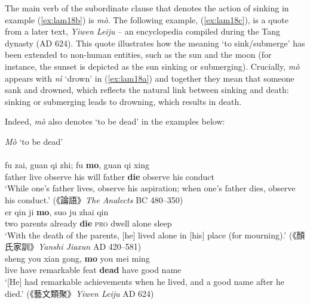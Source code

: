 \documentclass[output=paper,colorlinks,citecolor=brown,chinesefont]{langscibook}
\begin{document}
The main verb of the subordinate clause that denotes the action of sinking in example (\ref{ex:lam18b}) is \textit{mò}. The following example, (\ref{ex:lam18c}), is a quote from a later text, \emph{Yiwen Leiju} – an encyclopedia compiled during the Tang dynasty (AD 624). This quote illustrates how the meaning `to sink/submerge' has been extended to non-human entities, such as the sun and the moon (for instance, the sunset is depicted as the sun sinking or submerging). Crucially, \textit{mò} appears with \textit{nì} `drown' in (\ref{ex:lam18a}) and together they mean that someone sank and drowned, which reflects the natural link between sinking and death: sinking or submerging leads to drowning, which results in death. 

Indeed, \textit{mò} also denotes `to be dead' in the examples below: 

\newpage

\ea \textit{Mò} `to be dead'  \label{ex:lam19}\\
  \\
  	\gll fu zai, guan qi zhi; fu \textbf{mo}, guan qi xing\\
  	father live observe	his	will father	\textbf{die} observe his	conduct\\
  	\glt `While one's father lives, observe his aspiration; when one's father dies, observe his conduct.' ({\cn 《論語》}\emph{The Analects} BC 480–350)
   \label{ex:lam19b}\\
  	\gll er	qin	ji \textbf{mo}, suo ju zhai qin\\
  	two	parents	already	\textbf{die} \textsc{pro} dwell alone	sleep\\
  	\glt `With the death of the parents, [he] lived alone in [his] place (for mourning).' ({\cn 《顏氏家訓》}\emph{Yanshi Jiaxun} AD 420–581)
  \label{ex:lam19c}\\
	\gll sheng you xian gong, \textbf{mo} you mei ming\\ 
	live have remarkable feat \textbf{dead} have	good name\\
	\glt `[He] had remarkable achievements when he lived, and a good name after he died.' ({\cn 《藝文類聚》}\emph{Yiwen Leiju} AD 624)
\z \z
\end{document}
